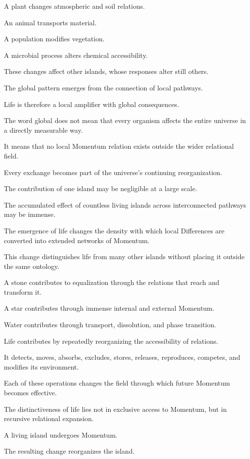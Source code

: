 A plant changes atmospheric and soil relations.

An animal transports material.

A population modifies vegetation.

A microbial process alters chemical accessibility.

These changes affect other islands, whose responses alter still others.

The global pattern emerges from the connection of local pathways.

Life is therefore a local amplifier with global consequences.

The word global does not mean that every organism affects the entire universe in a directly measurable way.

It means that no local Momentum relation exists outside the wider relational field.

Every exchange becomes part of the universe’s continuing reorganization.

The contribution of one island may be negligible at a large scale.

The accumulated effect of countless living islands across interconnected pathways may be immense.

The emergence of life changes the density with which local Differences are converted into extended networks of Momentum.

This change distinguishes life from many other islands without placing it outside the same ontology.

A stone contributes to equalization through the relations that reach and transform it.

A star contributes through immense internal and external Momentum.

Water contributes through transport, dissolution, and phase transition.

Life contributes by repeatedly reorganizing the accessibility of relations.

It detects, moves, absorbs, excludes, stores, releases, reproduces, competes, and modifies its environment.

Each of these operations changes the field through which future Momentum becomes effective.

The distinctiveness of life lies not in exclusive access to Momentum, but in recursive relational expansion.

A living island undergoes Momentum.

The resulting change reorganizes the island.

